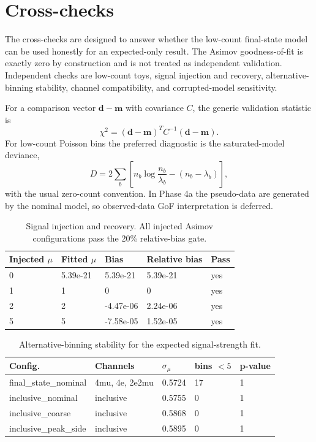 \documentclass[11pt]{article}
\begin{document}
\section{Cross-checks}
The cross-checks are designed to answer whether the low-count final-state model can be used honestly for an expected-only result. The Asimov goodness-of-fit is exactly zero by construction and is not treated as independent validation. Independent checks are low-count toys, signal injection and recovery, alternative-binning stability, channel compatibility, and corrupted-model sensitivity.

For a comparison vector $\mathbf{d}-\mathbf{m}$ with covariance $C$, the generic validation statistic is
\begin{equation}
 \chi^2=(\mathbf{d}-\mathbf{m})^T C^{-1}(\mathbf{d}-\mathbf{m}).
 \label{eq:chi2}
\end{equation}
For low-count Poisson bins the preferred diagnostic is the saturated-model deviance,
\begin{equation}
 D = 2\sum_b \left[n_b\log\frac{n_b}{\lambda_b} - (n_b-\lambda_b)\right],
 \label{eq:poisson-deviance}
\end{equation}
with the usual zero-count convention. In Phase 4a the pseudo-data are generated by the nominal model, so observed-data GoF interpretation is deferred.

\begin{table}[htbp]
\centering
\caption{Signal injection and recovery. All injected Asimov configurations pass the 20\% relative-bias gate.}
\begin{tabular}{lllll}
\toprule
Injected $\mu$ & Fitted $\mu$ & Bias & Relative bias & Pass \\ 
\midrule
0 & 5.39e-21 & 5.39e-21 & 5.39e-21 & yes \\
1 & 1 & 0 & 0 & yes \\
2 & 2 & -4.47e-06 & 2.24e-06 & yes \\
5 & 5 & -7.58e-05 & 1.52e-05 & yes \\
\bottomrule
\end{tabular}
\label{tab:injection}
\end{table}

\begin{table}[htbp]
\centering
\caption{Alternative-binning stability for the expected signal-strength fit.}
\begin{tabular}{lllll}
\toprule
Config. & Channels & $\sigma_\mu$ & bins $<5$ & p-value \\ 
\midrule
final\_state\_nominal & 4mu, 4e, 2e2mu & 0.5724 & 17 & 1 \\
inclusive\_nominal & inclusive & 0.5755 & 0 & 1 \\
inclusive\_coarse & inclusive & 0.5868 & 0 & 1 \\
inclusive\_peak\_side & inclusive & 0.5895 & 0 & 1 \\
\bottomrule
\end{tabular}
\label{tab:binning}
\end{table}
\end{document}
